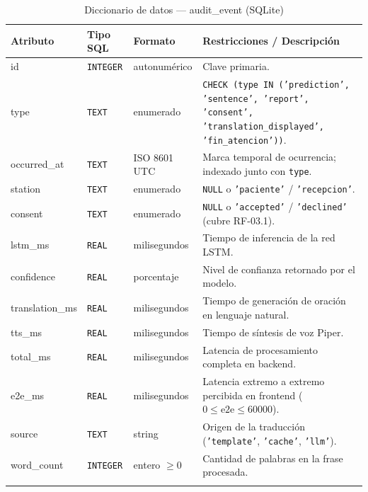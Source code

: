 \begin{longtable}{p{3.2cm} p{2.2cm} p{3.2cm} p{5.2cm}}
    \toprule
    \textbf{Atributo} & \textbf{Tipo SQL} & \textbf{Formato} & \textbf{Restricciones / Descripción} \\
    \midrule
    \endhead
    id & \texttt{INTEGER} & autonumérico & Clave primaria. \\
    type & \texttt{TEXT} & enumerado & \texttt{CHECK (type IN ('prediction', 'sentence', 'report', 'consent', 'translation\_displayed', 'fin\_atencion'))}. \\
    occurred\_at & \texttt{TEXT} & ISO 8601 UTC & Marca temporal de ocurrencia; indexado junto con \texttt{type}. \\
    station & \texttt{TEXT} & enumerado & \texttt{NULL} o \texttt{'paciente'} / \texttt{'recepcion'}. \\
    consent & \texttt{TEXT} & enumerado & \texttt{NULL} o \texttt{'accepted'} / \texttt{'declined'} (cubre RF-03.1). \\
    lstm\_ms & \texttt{REAL} & milisegundos & Tiempo de inferencia de la red LSTM. \\
    confidence & \texttt{REAL} & porcentaje & Nivel de confianza retornado por el modelo. \\
    translation\_ms & \texttt{REAL} & milisegundos & Tiempo de generación de oración en lenguaje natural. \\
    tts\_ms & \texttt{REAL} & milisegundos & Tiempo de síntesis de voz Piper. \\
    total\_ms & \texttt{REAL} & milisegundos & Latencia de procesamiento completa en backend. \\
    e2e\_ms & \texttt{REAL} & milisegundos & Latencia extremo a extremo percibida en frontend ($0 \leq \mathrm{e2e} \leq 60000$). \\
    source & \texttt{TEXT} & string & Origen de la traducción (\texttt{'template'}, \texttt{'cache'}, \texttt{'llm'}). \\
    word\_count & \texttt{INTEGER} & entero $\geq 0$ & Cantidad de palabras en la frase procesada. \\
    \bottomrule
    \caption{Diccionario de datos — audit\_event (SQLite)}
    \label{tab:dat-dic-audit-event}
\end{longtable}

